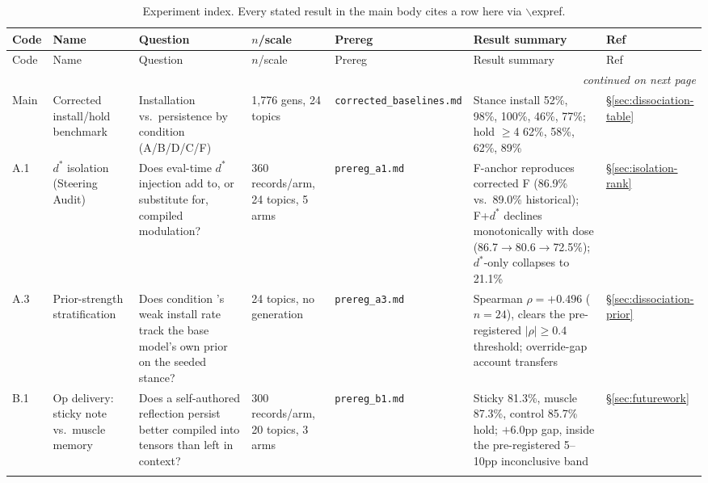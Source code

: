 \begingroup
\small
\setlength{\tabcolsep}{3pt}
\begin{longtable}{@{}p{}p{}p{}p{}p{}p{}p{}@{}}
\caption{Experiment index. Every stated result in the main body cites a row here via
\(\backslash\)expref{}.}
\label{tab:expindex}\\
\toprule
Code & Name & Question & \(n\)/scale & Prereg & Result summary & Ref \\
\midrule
\endfirsthead
\toprule
Code & Name & Question & \(n\)/scale & Prereg & Result summary & Ref \\
\midrule
\endhead
\midrule
\multicolumn{7}{r}{\textit{continued on next page}} \\
\endfoot
\bottomrule
\endlastfoot

\label{app:exp-main}Main &
Corrected install/hold benchmark &
Installation vs.\ persistence by condition (A/B/D/C/F) &
1{,}776 gens, 24 topics &
\texttt{corrected\_\allowbreak baselines.md} &
Stance install \condA{} 52\%, \condB{} 98\%, \condD{} 100\%, \condC{} 46\%, \condF{}
77\%; hold \(\ge\)4 \condA{} 62\%, \condB{} 58\%, \condD{} 62\%, \condF{} 89\% &
\S\ref{sec:dissociation-table} \\
\addlinespace

\label{app:exp-a1}A.1 &
\(d^*\) isolation (Steering Audit) &
Does eval-time \(d^*\) injection add to, or substitute for, compiled modulation? &
360 records/arm, 24 topics, 5 arms &
\texttt{prereg\_a1.md} &
F-anchor reproduces corrected F (86.9\% vs.\ 89.0\% historical); F+\(d^*\) declines
monotonically with dose (86.7\(\to\)80.6\(\to\)72.5\%); \(d^*\)-only collapses to 21.1\% &
\S\ref{sec:isolation-rank} \\
\addlinespace

\label{app:exp-a3}A.3 &
Prior-strength stratification &
Does condition \condC{}'s weak install rate track the base model's own prior on the
seeded stance? &
24 topics, no generation &
\texttt{prereg\_a3.md} &
Spearman \(\rho = +0.496\) (\(n=24\)), clears the pre-registered \(|\rho|\ge0.4\)
threshold; override-gap account transfers &
\S\ref{sec:dissociation-prior} \\
\addlinespace

\label{app:exp-b1}B.1 &
Op delivery: sticky note vs.\ muscle memory &
Does a self-authored reflection persist better compiled into tensors than left in
context? &
300 records/arm, 20 topics, 3 arms &
\texttt{prereg\_b1.md} &
Sticky 81.3\%, muscle 87.3\%, control 85.7\% hold; \(+6.0\)pp gap, inside the
pre-registered 5--10pp inconclusive band &
\S\ref{sec:futurework} \\
\addlinespace


\end{longtable}
